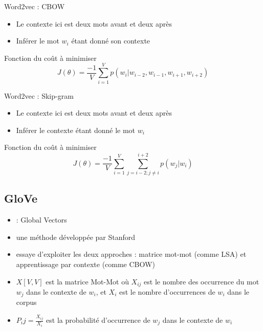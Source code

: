 \documentclass{KodeBook}
\begin{document}
Word2vec : CBOW
\begin{minipage}{.58\textwidth}
	\begin{itemize}
		\item Le contexte ici est deux mots avant et deux après
		\item Inférer le mot $w_i$ étant donné son contexte
	\end{itemize}
	\begin{block}{Fonction du coût à minimiser}
		\[%
		J(\theta) = \frac{-1}{V} \sum_{i=1}^{V} p(w_i |w_{i-2}, w_{i-1}, w_{i+1}, w_{i+2})
		\]
	\end{block}
\end{minipage}
\begin{minipage}{.08\textwidth}
\end{minipage}	
\begin{minipage}{.4\textwidth}
\end{minipage}

Word2vec : Skip-gram
\begin{minipage}{.58\textwidth}
	\begin{itemize}
		\item Le contexte ici est deux mots avant et deux après
		\item Inférer le contexte étant donné le mot $w_i$
	\end{itemize}
	\begin{block}{Fonction du coût à minimiser}
		\[%
		J(\theta) = \frac{-1}{V} \sum_{i=1}^{V} \sum_{j= i-2; j \ne i}^{i+2} p(w_j |w_i)
		\]
	\end{block}
\end{minipage}
\begin{minipage}{.08\textwidth}
\end{minipage}
\begin{minipage}{.4\textwidth}
\end{minipage}

\subsection{GloVe}

\begin{itemize}
	\item {} : Global Vectors
	\item une méthode développée par Stanford \cite{2014-pennington-al}
	\item essaye d'exploiter les deux approches : matrice mot-mot (comme LSA) et apprentissage par contexte (comme CBOW)
	\item $X[V, V]$ est la matrice Mot-Mot où $X_{ij}$ est le nombre des occurrence du mot $w_j$ dans le contexte de $w_i$, et $X_i$ est le nombre d'occurrences de $w_i$ dans le corpus
	\item $P_ij= \frac{X_{ij}}{X_i}$ est la probabilité d'occurrence de $w_j$ dans le contexte de $w_i$
\end{itemize}
\end{document}
